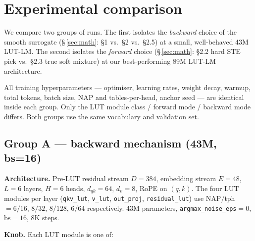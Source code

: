 \documentclass[11pt]{article}
\begin{document}
\clearpage
\section{Experimental comparison}\label{sec:exp}

We compare two groups of runs. The first isolates the \emph{backward} choice
of the smooth surrogate (\S\,\ref{sec:math}: \S1 vs.\ \S2 vs.\ \S2.5) at a
small, well-behaved 43M LUT-LM. The second isolates the \emph{forward} choice
(\S\,\ref{sec:math}: \S2.2 hard STE pick vs.\ \S2.3 true soft mixture) at our
best-performing 89M LUT-LM architecture.

All training hyperparameters --- optimiser, learning rates, weight decay,
warmup, total tokens, batch size, NAP and tables-per-head, anchor seed ---
are identical inside each group. Only the LUT module class / forward
mode / backward mode differs. Both groups use the same vocabulary and
validation set.

\subsection{Group A --- backward mechanism (43M, bs=16)}
\label{sec:expA}

\textbf{Architecture.} Pre-LUT residual stream $D{=}384$, embedding stream
$E{=}48$, $L{=}6$ layers, $H{=}6$ heads, $d_{qk}{=}64$, $d_v{=}8$, RoPE on
$(q,k)$. The four LUT modules per layer (\texttt{qkv\_lut}, \texttt{v\_lut},
\texttt{out\_proj}, \texttt{residual\_lut}) use NAP$/$tph
$=6/16$, $8/32$, $8/128$, $6/64$ respectively. 43M parameters,
\texttt{argmax\_noise\_eps}${=}0$, $\text{bs}{=}16$, 8K steps.

\textbf{Knob.} Each LUT module is one of:
\end{document}
